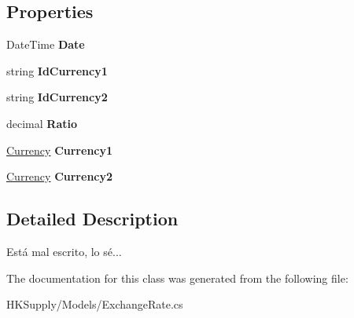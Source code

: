 \subsection*{Properties}
\begin{DoxyCompactItemize}
\item 
\mbox{\label{class_h_k_supply_1_1_models_1_1_exchange_rate_adc5aaf8d8a6d29225c64238a9949a7ce}} 
Date\+Time {\bfseries Date}
\item 
\mbox{\label{class_h_k_supply_1_1_models_1_1_exchange_rate_a9460942864a5d01cd369d29f1ed9f9fb}} 
string {\bfseries Id\+Currency1}
\item 
\mbox{\label{class_h_k_supply_1_1_models_1_1_exchange_rate_ab77ac54a267be84b869459630c408e48}} 
string {\bfseries Id\+Currency2}
\item 
\mbox{\label{class_h_k_supply_1_1_models_1_1_exchange_rate_a6451f8fcefd88dffaf2e76ebd8d0b541}} 
decimal {\bfseries Ratio}
\item 
\mbox{\label{class_h_k_supply_1_1_models_1_1_exchange_rate_a1e617625dfe3bcfd61adcca9ff1fba07}} 
\mbox{\hyperlink{class_h_k_supply_1_1_models_1_1_currency}{Currency}} {\bfseries Currency1}
\item 
\mbox{\label{class_h_k_supply_1_1_models_1_1_exchange_rate_a6f5535b18d27bde1ae2c75dcc571cad3}} 
\mbox{\hyperlink{class_h_k_supply_1_1_models_1_1_currency}{Currency}} {\bfseries Currency2}
\end{DoxyCompactItemize}


\subsection{Detailed Description}
Está mal escrito, lo sé... 



The documentation for this class was generated from the following file\+:\begin{DoxyCompactItemize}
\item 
H\+K\+Supply/\+Models/Exchange\+Rate.\+cs\end{DoxyCompactItemize}
